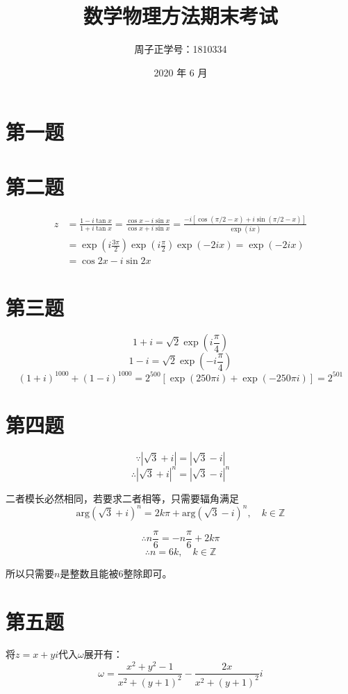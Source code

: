 \documentclass[a4paper]{ctexart}
\title{数学物理方法\quad 期末考试}
\author{周子正\quad 学号：1810334}
\date{2020 年 6 月}
\begin{document}
\maketitle
\section{第一题}

\section{第二题}

$$
    \begin{aligned}
        z & =\frac{1-i\tan x}{1+i\tan x}=\frac{\cos x-i\sin x}{\cos x+i\sin x}=\frac{-i\left[ \cos \left( \pi /2-x \right) +i\sin \left( \pi /2-x \right) \right]}{\exp \left( ix \right)} \\
          & =\exp \left( i\frac{3\pi}{2} \right) \exp \left( i\frac{\pi}{2} \right) \exp \left( -2ix \right) =\exp \left( -2ix \right)                                                     \\
          & =\cos 2x-i\sin 2x
    \end{aligned}
$$


\section{第三题}

$$
    1+i=\sqrt{2}\exp \left( i\frac{\pi}{4} \right)
$$
$$
    1-i=\sqrt{2}\exp \left( -i\frac{\pi}{4} \right)
$$
$$
    \left( 1+i \right) ^{1000}+\left( 1-i \right) ^{1000}=2^{500}\left[ \exp \left( 250\pi i \right) +\exp \left( -250\pi i \right) \right] =2^{501}
$$


\section{第四题}

$$
    \because |\sqrt{3}+i|=|\sqrt{3}-i|
$$
$$
    \therefore |\sqrt{3}+i|^n=|\sqrt{3}-i|^n
$$

二者模长必然相同，若要求二者相等，只需要辐角满足
$$
    \text{arg}\left( \sqrt{3}+i \right) ^n=2k\pi +\text{arg}\left( \sqrt{3}-i \right) ^n,\quad k\in \mathbb{Z}
$$

$$
    \therefore n\frac{\pi}{6}=-n\frac{\pi}{6}+2k\pi
$$
$$
    \therefore n=6k,\quad k\in \mathbb{Z}
$$

所以只需要$n$是整数且能被$6$整除即可。

\section{第五题}
将$z=x+yi$代入$\omega$展开有：
$$\omega=\frac{x^{2}+y^{2}-1}{x^{2}+(y+1)^{2}}-\frac{2 x}{x^{2}+(y+1)^{2}} i$$
\end{document}

